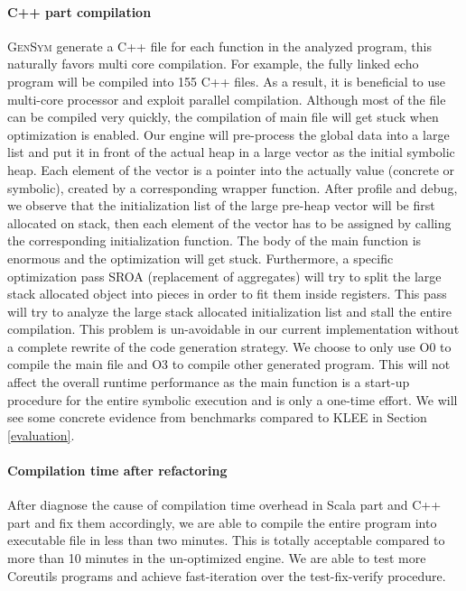 \documentclass[sigplan, nonacm]{acmart}\settopmatter{printfolios=true,printccs=false,printacmref=false}
\newcommand{\tool}{\textsc{GenSym}\xspace}
\begin{document}
\paragraph*{C++ part compilation}
\tool generate a C++ file for each function in the analyzed program, this naturally favors multi core compilation. For example, the fully linked echo program will be compiled into 155 C++ files. As a result, it is beneficial to use multi-core processor and exploit parallel compilation. Although most of the file can be compiled very quickly, the compilation of main file will get stuck when optimization is enabled. Our engine will pre-process the global data into a large list and put it in front of the actual heap in a large vector as the initial symbolic heap. Each element of the vector is a pointer into the actually value (concrete or symbolic), created by a corresponding wrapper function. After profile and debug, we observe that the initialization list of the large pre-heap vector will be first allocated on stack, then each element of the vector has to be assigned by calling the corresponding initialization function. The body of the main function is enormous and the optimization will get stuck. Furthermore, a specific optimization pass SROA (replacement of aggregates) will try to split the large stack allocated object into pieces in order to fit them inside registers. This pass will try to analyze the large stack allocated initialization list and stall the entire compilation. This problem is un-avoidable in our current implementation without a complete rewrite of the code generation strategy. We choose to only use O0 to compile the main file and O3 to compile other generated program. This will not affect the overall runtime performance as the main function is a start-up procedure for the entire symbolic execution and is only a one-time effort. We will see some concrete evidence from benchmarks compared to KLEE in Section \ref{evaluation}.
\paragraph*{Compilation time after refactoring}
After diagnose the cause of compilation time overhead in Scala part and C++ part and fix them accordingly, we are able to compile the entire program into executable file in less than two minutes. This is totally acceptable compared to more than 10 minutes in the un-optimized engine. We are able to test more Coreutils programs and achieve fast-iteration over the test-fix-verify procedure.
\end{document}
